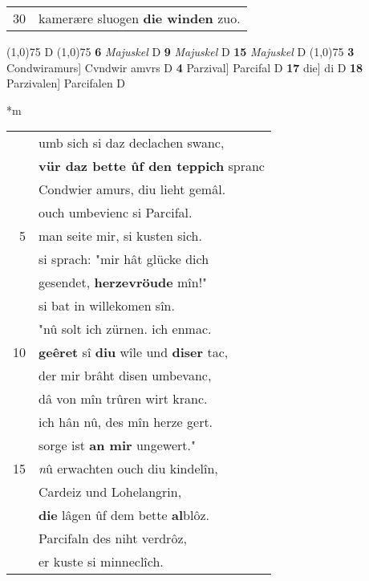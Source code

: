 \documentclass[8pt,a4paper,notitlepage]{article}
\begin{document}
\begin{table}[ht]
\begin{minipage}[t]{0.5\linewidth}
\begin{tabular}{rl}
30 & kamerære sluogen \textbf{die winden} zuo.\\ 
\end{tabular}
\scriptsize
\line(1,0){75} \newline
D \newline
\line(1,0){75} \newline
\textbf{6} \textit{Majuskel} D  \textbf{9} \textit{Majuskel} D  \textbf{15} \textit{Majuskel} D  \newline
\line(1,0){75} \newline
\textbf{3} Condwiramurs] Cvndwir amvrs D \textbf{4} Parzival] Parcifal D \textbf{17} die] di D \textbf{18} Parzivalen] Parcifalen D \newline
\end{minipage}
\hspace{0.5cm}
\begin{minipage}[t]{0.5\linewidth}
\small
\begin{center}*m
\end{center}
\begin{tabular}{rl}
 & umb sich si daz declachen swanc,\\ 
 & \textbf{vür daz bette ûf den teppich} spranc\\ 
 & Condwier amurs, diu lieht gemâl.\\ 
 & ouch umbevienc si Parcifal.\\ 
5 & man seite mir, si kusten sich.\\ 
 & si sprach: "mir hât glücke dich\\ 
 & gesendet, \textbf{herzevröude} mîn!"\\ 
 & si bat in willekomen sîn.\\ 
 & "nû solt ich zürnen. ich enmac.\\ 
10 & \textbf{geêret} sî \textbf{diu} wîle und \textbf{diser} tac,\\ 
 & der mir brâht disen umbevanc,\\ 
 & dâ von mîn trûren wirt kranc.\\ 
 & ich hân nû, des mîn herze gert.\\ 
 & sorge ist \textbf{an mir} ungewert."\\ 
15 & \textit{n}û erwachten ouch diu kindelîn,\\ 
 & Cardeiz und Lohelangrin,\\ 
 & \textbf{die} lâgen ûf dem bette \textbf{al}blôz.\\ 
 & Parcifaln des niht verdrôz,\\ 
 & er kuste si minneclîch.\\ 

\end{tabular}
\end{minipage}
\end{table}
\end{document}
